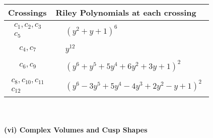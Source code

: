 \documentclass[1p]{elsarticle_modified}
\theoremstyle{definition}
\begin{document}
\begin{tabular}{m{50pt}|m{274pt}}
Crossings & \hspace{64pt}Riley Polynomials at each crossing \\
\hline $$\begin{aligned}c_{1},c_{2},c_{3}\\c_{5}\end{aligned}$$&$\begin{aligned}
&(y^2+y+1)^6
\end{aligned}$\\
\hline $$\begin{aligned}c_{4},c_{7}\end{aligned}$$&$\begin{aligned}
&y^{12}
\end{aligned}$\\
\hline $$\begin{aligned}c_{6},c_{9}\end{aligned}$$&$\begin{aligned}
&(y^6+y^5+5 y^4+6 y^2+3 y+1)^2
\end{aligned}$\\
\hline $$\begin{aligned}c_{8},c_{10},c_{11}\\c_{12}\end{aligned}$$&$\begin{aligned}
&(y^6-3 y^5+5 y^4-4 y^3+2 y^2- y+1)^2
\end{aligned}$\\
\hline
\end{tabular}\\~\\
\newpage\flushleft \textbf{(vi) Complex Volumes and Cusp Shapes}
\end{document}
